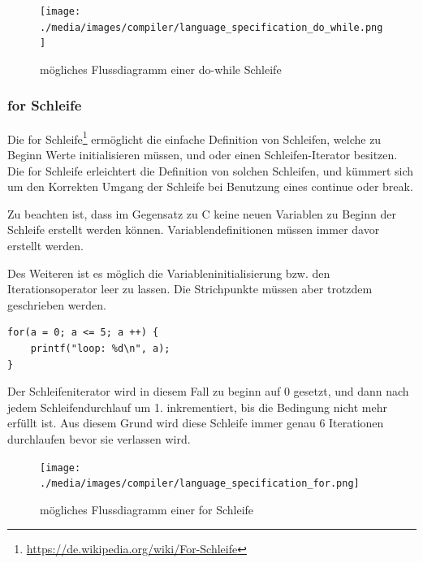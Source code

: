 \begin{figure}[h]
\centering
\texttt{[image: ./media/images/compiler/language\_specification\_do\_while.png]}
\caption{m\"ogliches Flussdiagramm einer do-while Schleife}
\label{language_specification_do_while}
\end{figure}

\newpage
\subsubsection{for Schleife}

Die for Schleife\footnote{\url{https://de.wikipedia.org/wiki/For-Schleife}} erm\"oglicht die einfache Definition von Schleifen, welche zu Beginn Werte initialisieren m\"ussen, und oder einen Schleifen-Iterator besitzen. Die for Schleife erleichtert die Definition von solchen Schleifen, und k\"ummert sich um den Korrekten Umgang der Schleife bei Benutzung eines continue oder break.

Zu beachten ist, dass im Gegensatz zu C keine neuen Variablen zu Beginn der Schleife erstellt werden k\"onnen. Variablendefinitionen m\"ussen immer davor erstellt werden.

Des Weiteren ist es m\"oglich die Variableninitialisierung bzw. den Iterationsoperator leer zu lassen. Die Strichpunkte m\"ussen aber trotzdem geschrieben werden.


\begin{lstlisting}[language=CMM]
for(a = 0; a <= 5; a ++) {
	printf("loop: %d\n", a);
}
\end{lstlisting}

Der Schleifeniterator wird in diesem Fall zu beginn auf 0 gesetzt, und dann nach jedem Schleifendurchlauf um 1. inkrementiert, bis die Bedingung nicht mehr erf\"ullt ist. Aus diesem Grund wird diese Schleife immer genau 6 Iterationen durchlaufen bevor sie verlassen wird. 

\begin{figure}[h]
\centering
\texttt{[image: ./media/images/compiler/language\_specification\_for.png]}
\caption{m\"ogliches Flussdiagramm einer for Schleife}
\label{language_specification_for}
\end{figure}